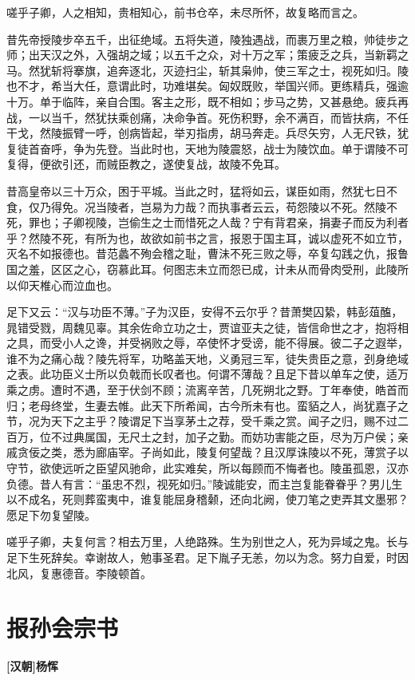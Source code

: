 \documentclass[UTF8,titlepage,oneside]{ctexbook}
\begin{document}
嗟乎子卿，人之相知，贵相知心，前书仓卒，未尽所怀，故复略而言之。

昔先帝授陵步卒五千，出征绝域。五将失道，陵独遇战，而裹万里之粮，帅徒步之师；出天汉之外，入强胡之域；以五千之众，对十万之军；策疲乏之兵，当新羁之马。然犹斩将搴旗，追奔逐北，灭迹扫尘，斩其枭帅，使三军之士，视死如归。陵也不才，希当大任，意谓此时，功难堪矣。匈奴既败，举国兴师。更练精兵，强逾十万。单于临阵，亲自合围。客主之形，既不相如；步马之势，又甚悬绝。疲兵再战，一以当千，然犹扶乘创痛，决命争首。死伤积野，余不满百，而皆扶病，不任干戈，然陵振臂一呼，创病皆起，举刃指虏，胡马奔走。兵尽矢穷，人无尺铁，犹复徒首奋呼，争为先登。当此时也，天地为陵震怒，战士为陵饮血。单于谓陵不可复得，便欲引还，而贼臣教之，遂使复战，故陵不免耳。

昔高皇帝以三十万众，困于平城。当此之时，猛将如云，谋臣如雨，然犹七日不食，仅乃得免。况当陵者，岂易为力哉？而执事者云云，苟怨陵以不死。然陵不死，罪也；子卿视陵，岂偷生之士而惜死之人哉？宁有背君亲，捐妻子而反为利者乎？然陵不死，有所为也，故欲如前书之言，报恩于国主耳，诚以虚死不如立节，灭名不如报德也。昔范蠡不殉会稽之耻，曹沬不死三败之辱，卒复勾践之仇，报鲁国之羞，区区之心，窃慕此耳。何图志未立而怨已成，计未从而骨肉受刑，此陵所以仰天椎心而泣血也。

足下又云：“汉与功臣不薄。”子为汉臣，安得不云尔乎？昔萧樊囚絷，韩彭葅醢，晁错受戮，周魏见辜。其余佐命立功之士，贾谊亚夫之徒，皆信命世之才，抱将相之具，而受小人之谗，并受祸败之辱，卒使怀才受谤，能不得展。彼二子之遐举，谁不为之痛心哉？陵先将军，功略盖天地，义勇冠三军，徒失贵臣之意，刭身绝域之表。此功臣义士所以负戟而长叹者也。何谓不薄哉？且足下昔以单车之使，适万乘之虏。遭时不遇，至于伏剑不顾；流离辛苦，几死朔北之野。丁年奉使，皓首而归；老母终堂，生妻去帷。此天下所希闻，古今所未有也。蛮貊之人，尚犹嘉子之节，况为天下之主乎？陵谓足下当享茅土之荐，受千乘之赏。闻子之归，赐不过二百万，位不过典属国，无尺土之封，加子之勤。而妨功害能之臣，尽为万户侯；亲戚贪佞之类，悉为廊庙宰。子尚如此，陵复何望哉？且汉厚诛陵以不死，薄赏子以守节，欲使远听之臣望风驰命，此实难矣，所以每顾而不悔者也。陵虽孤恩，汉亦负德。昔人有言：“虽忠不烈，视死如归。”陵诚能安，而主岂复能眷眷乎？男儿生以不成名，死则葬蛮夷中，谁复能屈身稽颡，还向北阙，使刀笔之吏弄其文墨邪？愿足下勿复望陵。

嗟乎子卿，夫复何言？相去万里，人绝路殊。生为别世之人，死为异域之鬼。长与足下生死辞矣。幸谢故人，勉事圣君。足下胤子无恙，勿以为念。努力自爱，时因北风，复惠德音。李陵顿首。


\chapter*{报孙会宗书}
\begin{center}
	\textbf{[汉朝]杨恽}
\end{center}
\end{document}
